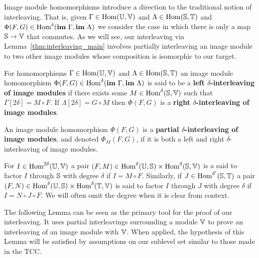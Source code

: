 Image module homomorphisms introduce a direction to the traditional notion of interleaving.
That is, given $\Gamma\in\Hom(\UU,\VV)$ and $\Lambda\in\Hom(\S,\T)$ and $\Phi(F, G)\in\Hom^\delta(\im~\Gamma, \im~\Lambda)$ we consider the case in which there is only a map $\S\to\VV$ that commutes.
As we will see, our interleaving via Lemma~\ref{thm:interleaving_main} involves partially interleaving an image module to two other image modules whose composition is isomorphic to our target.

\begin{definition}
  For homomorphisms $\Gamma\in\Hom(\UU,\VV)$ and $\Lambda\in\Hom(\S,\T)$ an image module homomorphism $\Phi(F, G)\in\Hom^\delta(\im~\Gamma,\im~\Lambda)$ is said to be a \textbf{left $\delta$-interleaving of image modules} if there exists some $M\in\Hom^\delta(\S,\VV)$ such that $\Gamma[2\delta] = M\circ F$.
  If $\Lambda[2\delta] = G\circ M$ then $\Phi(F, G)$ is a \textbf{right $\delta$-interleaving of image modules}.

  An image module homomorphism $\Phi(F, G)$ is a \textbf{partial $\delta$-interleaving of image modules}, and denoted $\Phi_M(F, G)$, if it is both a left and right $\delta$-interleaving of image modules.
\end{definition}

For $I\in\Hom^{2\delta}(\UU,\VV)$ a pair $(F, M)\in \Hom^\delta(\UU,\S)\times\Hom^\delta(\S,\VV)$ is a said to factor $I$ through $\S$ with degree $\delta$ if $I = M\circ F$.
Similarly, if $J\in\Hom^{\delta'}(\S,\T)$ a pair $(F,N)\in\Hom^\delta(\UU,\S)\times\Hom^\delta(\T,\VV)$ is said to factor $I$ through $J$ with degree $\delta$ if $I = N\circ J\circ F$.
We will often omit the degree when it is clear from context.

The following Lemma can be seen as the primary tool for the proof of our interleaving.
It uses partial interleavings surrounding a module $\VV$ to prove an interleaving of an image module with $\VV$.
When applied, the hypothesis of this Lemma will be satisfied by assumptions on our sublevel set similar to those made in the TCC.


